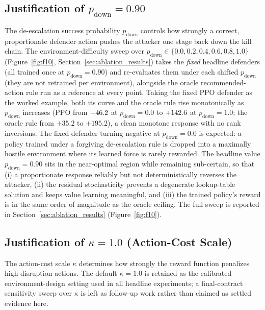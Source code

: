 \subsection{Justification of \texorpdfstring{$p_{\mathrm{down}} = 0.90$}{p\_down = 0.90}}\label{ssec:pdeesc_justification}
The de-escalation success probability $p_{\mathrm{down}}$ controls how strongly a correct, proportionate defender action pushes the attacker one stage back down the kill chain. The environment-difficulty sweep over $p_{\mathrm{down}} \in \{0.0, 0.2, 0.4, 0.6, 0.8, 1.0\}$ (Figure~\ref{fig:f10}, Section~\ref{sec:ablation_results}) takes the \emph{fixed} headline defenders (all trained once at $p_{\mathrm{down}} = 0.90$) and re-evaluates them under each shifted $p_{\mathrm{down}}$ (they are not retrained per environment), alongside the oracle recommended-action rule run as a reference at every point. Taking the fixed PPO defender as the worked example, both its curve and the oracle rule rise monotonically as $p_{\mathrm{down}}$ increases (PPO from $-46.2$ at $p_{\mathrm{down}} = 0.0$ to $+142.6$ at $p_{\mathrm{down}} = 1.0$; the oracle rule from $+35.2$ to $+195.2$), a clean monotone response with no rank inversions. The fixed defender turning negative at $p_{\mathrm{down}} = 0.0$ is expected: a policy trained under a forgiving de-escalation rule is dropped into a maximally hostile environment where its learned force is rarely rewarded. The headline value $p_{\mathrm{down}} = 0.90$ sits in the near-optimal region while remaining sub-certain, so that (i) a proportionate response reliably but not deterministically reverses the attacker, (ii) the residual stochasticity prevents a degenerate lookup-table solution and keeps value learning meaningful, and (iii) the trained policy's reward is in the same order of magnitude as the oracle ceiling. The full sweep is reported in Section~\ref{sec:ablation_results} (Figure~\ref{fig:f10}).

\subsection{Justification of \texorpdfstring{$\kappa = 1.0$}{kappa = 1.0} (Action-Cost Scale)}\label{ssec:action_cost_justification}
The action-cost scale $\kappa$ determines how strongly the reward function penalizes high-disruption actions. The default $\kappa = 1.0$ is retained as the calibrated environment-design setting used in all headline experiments; a final-contract sensitivity sweep over $\kappa$ is left as follow-up work rather than claimed as settled evidence here.

